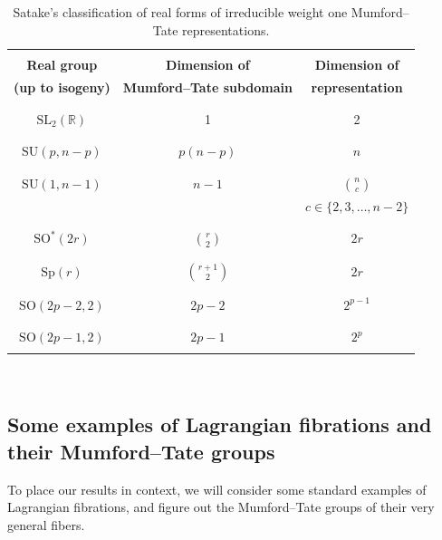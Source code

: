 \documentclass[12pt]{amsart}
\newcommand{\R}{\mathbb{R}}
\newcommand{\Sp}{\mathrm{Sp}}
\newcommand{\SL}{\mathrm{SL}}
\theoremstyle{definition}
\numberwithin{equation}{section}
\begin{document}
\begin{table}
    \centering
    \begin{tabular}{|c||c|c|}
        \hline && \\
        {\bf Real group } & {\bf Dimension of } & {\bf Dimension of } \\
        {\bf (up to isogeny)} & {\bf Mumford--Tate subdomain} & {\bf representation}\\ && \\
        \hline && \\
        \(\SL_2(\R)\) & 1 & 2 \\ && \\ \hline &&\\
        \(\mathrm{SU}(p, n-p)\) & \(p(n-p)\) & \(n\) \\ && \\ \hline &&\\
        \(\mathrm{SU}(1, n-1)\) & \(n-1\) & \(\binom{n}{c}\)\\ && \(c \in \{2, 3, \dots, n-2\}\) \\ && \\ \hline &&\\
        \(\mathrm{SO}^*(2r)\) & \(\binom{r}{2}\) & \(2r\) \\ && \\ \hline &&\\
        \(\Sp(r)\) & \(\binom{r+1}{2}\) & \(2r\) \\ && \\ \hline &&\\
        \(\mathrm{SO}(2p-2, 2)\) & \(2p-2\) & \(2^{p-1}\) \\ && \\ \hline &&\\
        \(\mathrm{SO}(2p-1, 2)\) & \(2p-1\) & \(2^p\) \\ && \\  
        \hline
    \end{tabular} \\
    \caption{Satake's classification of real forms of irreducible weight one Mumford--Tate representations.}
    \label{table-of-real-forms}
\end{table}


\subsection{Some examples of Lagrangian fibrations and their Mumford--Tate groups}

To place our results in context, we will consider some standard examples of Lagrangian
fibrations, and figure out the Mumford--Tate groups of their very general fibers. 
\end{document}
